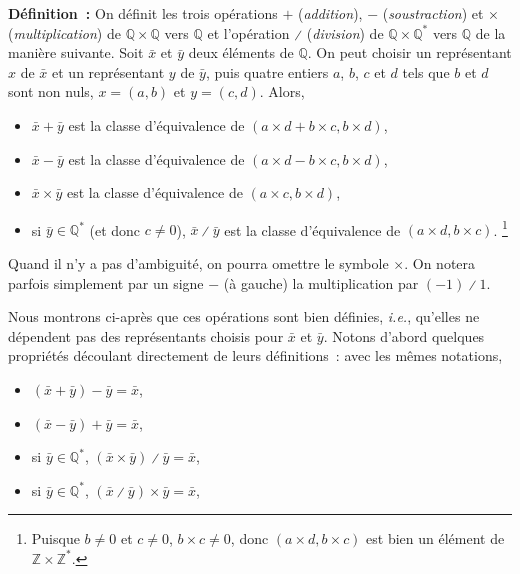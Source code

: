 \noindent\textbf{Définition :} On définit les trois opérations $+$ (\emph{addition}), $-$ (\emph{soustraction}) et $\times$ (\emph{multiplication}) de $\mathbb{Q} \times \mathbb{Q}$ vers $\mathbb{Q}$ et l'opération $\divslash$ (\emph{division}) de $\mathbb{Q} \times \mathbb{Q}^*$ vers $\mathbb{Q}$ de la manière suivante.  
\sindex[isy]{$+$}\sindex[isy]{$-$}\sindex[isy]{$\times$}\sindex[isy]{$\divslash$}
Soit $\bar{x}$ et $\bar{y}$ deux éléments de $\mathbb{Q}$. 
On peut choisir un représentant $x$ de $\bar{x}$ et un représentant $y$ de $\bar{y}$, puis quatre entiers $a$, $b$, $c$ et $d$ tels que $b$ et $d$ sont non nuls, $x = (a, b)$ et $y = (c, d)$.
Alors, 
\begin{itemize}[nosep]
    \item $\bar{x} + \bar{y}$ est la classe d'équivalence de $(a \times d + b \times c, b \times d)$,
    \item $\bar{x} - \bar{y}$ est la classe d'équivalence de $(a \times d - b \times c, b \times d)$,
    \item $\bar{x} \times \bar{y}$ est la classe d'équivalence de $(a \times c, b \times d)$,
    \item si $\bar{y} \in \mathbb{Q}^*$ (et donc $c \neq 0$), $\bar{x} \divslash \bar{y}$ est la classe d'équivalence de $(a \times d, b \times c)$.%
        \footnote{Puisque $b \neq 0$ et $c \neq 0$, $b \times c \neq 0$, donc $(a \times d, b \times c)$ est bien un élément de $\mathbb{Z} \times \mathbb{Z}^*$.}
\end{itemize}
Quand il n'y a pas d'ambiguité, on pourra omettre le symbole $\times$. 
On notera parfois simplement par un signe $-$ (à gauche) la multiplication par $(-1) \divslash 1$.

\medskip

Nous montrons ci-après que ces opérations sont bien définies, \emph{i.e.}, qu'elles ne dépendent pas des représentants choisis pour $\bar{x}$ et $\bar{y}$.
Notons d'abord quelques propriétés découlant directement de leurs définitions : avec les mêmes notations, 
\begin{itemize}[nosep]
    \item $(\bar{x} + \bar{y}) - \bar{y} = \bar{x}$,
    \item $(\bar{x} - \bar{y}) + \bar{y} = \bar{x}$,
    \item si $\bar{y} \in \mathbb{Q}^*$, $(\bar{x} \times \bar{y}) \divslash \bar{y} = \bar{x}$,
    \item si $\bar{y} \in \mathbb{Q}^*$, $(\bar{x} \divslash \bar{y}) \times \bar{y} = \bar{x}$,
\end{itemize}

